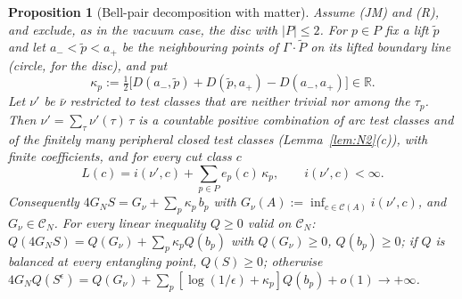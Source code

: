 \documentclass[aps,prd,onecolumn,superscriptaddress,nofootinbib,amsmath,amssymb,11pt]{revtex4-2}
\newtheorem{proposition}[theorem]{Proposition}
\theoremstyle{definition}
\newcommand{\R}{\mathbb{R}}
\newcommand{\Cut}{\mathcal{C}}
\newcommand{\CN}{\mathcal{C}_N}
\newcommand{\eps}{\epsilon}
\newcommand{\Pt}{\tilde P}
\begin{document}
\begin{proposition}[Bell-pair decomposition with matter]\label{prop:bellmatter}
Assume (JM) and (R), and exclude, as in the vacuum case, the disc with $|P|\le2$. For $p\in P$ fix a lift $\tilde p$ and let
$a_-<\tilde p<a_+$ be the neighbouring points of $\Gamma\cdot\Pt$ on its lifted boundary line (circle, for the disc), and put
\[
\kappa_p:=\tfrac12\big[D(a_-,\tilde p)+D(\tilde p,a_+)-D(a_-,a_+)\big]\in\R .
\]
Let $\nu'$ be $\bar\nu$ restricted to test classes that are neither trivial nor among the $\tau_p$. Then $\nu'=\sum_\tau\nu'(\tau)\,\tau$ is
a countable positive combination of arc test classes and of the finitely many peripheral closed test classes
(Lemma~\ref{lem:N2}(c)), with finite coefficients, and for every cut class $c$
\begin{equation}\label{eq:Rmatter}
L(c)=i(\nu',c)+\sum_{p\in P}e_p(c)\,\kappa_p,\qquad i(\nu',c)<\infty .
\end{equation}
Consequently $4G_NS=G_\nu+\sum_p\kappa_p\,b_p$ with $G_\nu(A):=\inf_{c\in\Cut(A)}i(\nu',c)$, and $G_\nu\in\CN$. For every linear
inequality $Q\ge0$ valid on $\CN$: $Q(4G_NS)=Q(G_\nu)+\sum_p\kappa_pQ(b_p)$ with $Q(G_\nu)\ge0$, $Q(b_p)\ge0$; if $Q$ is balanced at
every entangling point, $Q(S)\ge0$; otherwise $4G_NQ(S^\eps)=Q(G_\nu)+\sum_p[\log(1/\eps)+\kappa_p]Q(b_p)+o(1)\to+\infty$.
\end{proposition}
\end{document}
